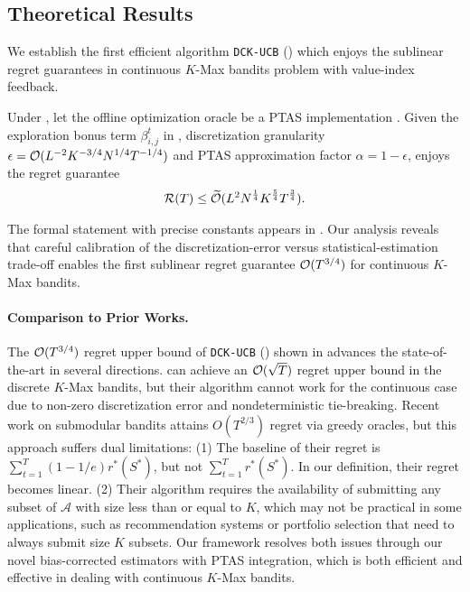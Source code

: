 \subsection{Theoretical Results}
\label{sec:result}
We establish the first efficient algorithm \texttt{DCK-UCB} () which enjoys the sublinear regret guarantees in continuous $K$-Max bandits problem with value-index feedback. 
\begin{theorem}
\label{thm:main}
Under , let the offline optimization oracle be a PTAS implementation \citep{chen2016combinatorial}. Given the exploration bonus term $\beta_{i,j}^t$ in , discretization granularity $\epsilon = {\mathcal{O}}(L^{-2}K^{-3/4}N^{1/4}T^{-1/4})$ and PTAS approximation factor $\alpha = 1 - \epsilon$,  enjoys the regret guarantee
\begin{align*}
    {\mathcal{R}}(T) \le \widetilde{{\mathcal{O}}}(L^{2}N^{\frac{1}{4}}K^{\frac{5}{4}}T^{\frac{3}{4}}).
\end{align*}
\end{theorem}
The formal statement with precise constants appears in . Our analysis reveals that careful calibration of the discretization-error versus statistical-estimation trade-off enables the first sublinear regret guarantee ${\mathcal{O}}(T^{3/4})$ for continuous $K$-Max bandits. 

\paragraph{Comparison to Prior Works.} The ${\mathcal{O}}(T^{3/4})$ regret upper bound of \texttt{DCK-UCB} () shown in  advances the state-of-the-art in several directions. \citet{wang2023combinatorial} can achieve an ${\mathcal{O}}(\sqrt{T})$ regret upper bound in the discrete $K$-Max bandits, but their algorithm cannot work for the continuous case due to non-zero discretization error and nondeterministic tie-breaking.
%
Recent work on submodular bandits \citep{pasteris2023sum,fourati2024combinatorial} attains $O(T^{2/3})$ regret via greedy oracles, but this approach suffers dual limitations: (1) The baseline of their regret is $\sum_{t=1}^T (1-1/e)r^*(S^*)$, but not $\sum_{t=1}^T r^*(S^*)$. In our definition, their regret becomes linear.   (2) Their algorithm requires the availability of submitting any subset of $\mathcal{A}$ with size less than or equal to $K$, which may not be practical in some applications, such as recommendation systems or portfolio selection that need to always submit size $K$ subsets. Our framework resolves both issues through our novel bias-corrected estimators with PTAS integration, which is both efficient and effective in dealing with continuous $K$-Max bandits.


